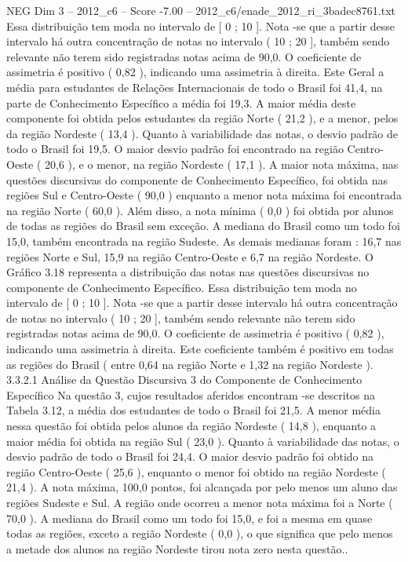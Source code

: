 \begin{textsample}{NEG Dim 3 – 2012\_c6 – Score -7.00 – 2012\_c6/enade\_2012\_ri\_3badec8761.txt}
Essa distribuição tem moda no intervalo de [ 0 ; 10 ].
Nota -se que a partir desse intervalo há outra concentração de notas no intervalo ( 10 ; 20 ], também sendo relevante não terem sido registradas notas acima de 90,0.
O coeficiente de assimetria é positivo ( 0,82 ), indicando uma assimetria à direita.
Este Geral a média para estudantes de Relações Internacionais de todo o Brasil foi 41,4, na parte de Conhecimento Específico a média foi 19,3.
A maior média deste componente foi obtida pelos estudantes da região Norte ( 21,2 ), e a menor, pelos da região Nordeste ( 13,4 ).
Quanto à variabilidade das notas, o desvio padrão de todo o Brasil foi 19,5.
O maior desvio padrão foi encontrado na região Centro-Oeste ( 20,6 ), e o menor, na região Nordeste ( 17,1 ).
A maior nota máxima, nas questões discursivas do componente de Conhecimento Específico, foi obtida nas regiões Sul e Centro-Oeste ( 90,0 ) enquanto a menor nota máxima foi encontrada na região Norte ( 60,0 ).
Além disso, a nota mínima ( 0,0 ) foi obtida por alunos de todas as regiões do Brasil sem exceção.
A mediana do Brasil como um todo foi 15,0, também encontrada na região Sudeste.
As demais medianas foram : 16,7 nas regiões Norte e Sul, 15,9 na região Centro-Oeste e 6,7 na região Nordeste.
O Gráfico 3.18 representa a distribuição das notas nas questões discursivas no componente de Conhecimento Específico.
Essa distribuição tem moda no intervalo de [ 0 ; 10 ].
Nota -se que a partir desse intervalo há outra concentração de notas no intervalo ( 10 ; 20 ], também sendo relevante não terem sido registradas notas acima de 90,0.
O coeficiente de assimetria é positivo ( 0,82 ), indicando uma assimetria à direita.
Este coeficiente também é positivo em todas as regiões do Brasil ( entre 0,64 na região Norte e 1,32 na região Nordeste ). 3.3.2.1 Análise da Questão Discursiva 3 do Componente de Conhecimento Específico Na questão 3, cujos resultados aferidos encontram -se descritos na Tabela 3.12, a média dos estudantes de todo o Brasil foi 21,5.
A menor média nessa questão foi obtida pelos alunos da região Nordeste ( 14,8 ), enquanto a maior média foi obtida na região Sul ( 23,0 ).
Quanto à variabilidade das notas, o desvio padrão de todo o Brasil foi 24,4.
O maior desvio padrão foi obtido na região Centro-Oeste ( 25,6 ), enquanto o menor foi obtido na região Nordeste ( 21,4 ).
A nota máxima, 100,0 pontos, foi alcançada por pelo menos um aluno das regiões Sudeste e Sul.
A região onde ocorreu a menor nota máxima foi a Norte ( 70,0 ).
A mediana do Brasil como um todo foi 15,0, e foi a mesma em quase todas as regiões, exceto a região Nordeste ( 0,0 ), o que significa que pelo menos a metade dos alunos na região Nordeste tirou nota zero nesta questão..

\end{textsample}
